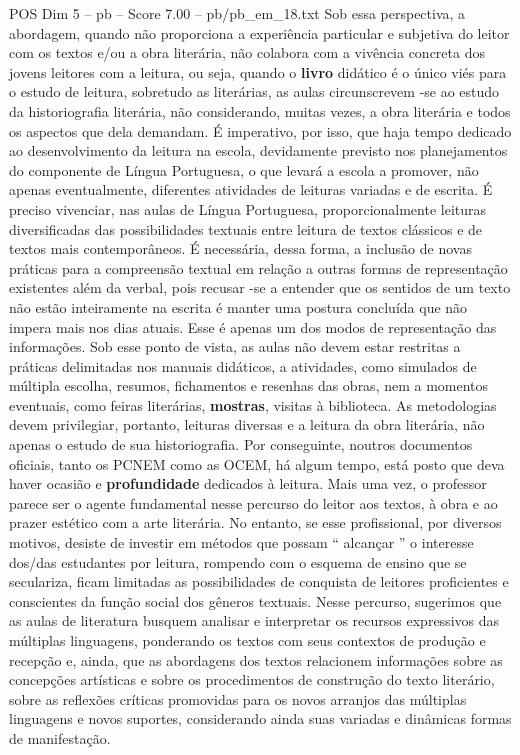 \begin{textsample}{POS Dim 5 – pb – Score 7.00 – pb/pb\_em\_18.txt}
Sob essa perspectiva, a abordagem, quando não proporciona a experiência particular e subjetiva do leitor com os textos e/ou a obra literária, não colabora com a vivência concreta dos jovens leitores com a leitura, ou seja, quando o \textbf{livro} didático é o único viés para o estudo de leitura, sobretudo as literárias, as aulas circunscrevem -se ao estudo da historiografia literária, não considerando, muitas vezes, a obra literária e todos os aspectos que dela demandam.
É imperativo, por isso, que haja tempo dedicado ao desenvolvimento da leitura na escola, devidamente previsto nos planejamentos do componente de Língua Portuguesa, o que levará a escola a promover, não apenas eventualmente, diferentes atividades de leituras variadas e de escrita.
É preciso vivenciar, nas aulas de Língua Portuguesa, proporcionalmente leituras diversificadas das possibilidades textuais entre leitura de textos clássicos e de textos mais contemporâneos.
É necessária, dessa forma, a inclusão de novas práticas para a compreensão textual em relação a outras formas de representação existentes além da verbal, pois recusar -se a entender que os sentidos de um texto não estão inteiramente na escrita é manter uma postura concluída que não impera mais nos dias atuais.
Esse é apenas um dos modos de representação das informações.
Sob esse ponto de vista, as aulas não devem estar restritas a práticas delimitadas nos manuais didáticos, a atividades, como simulados de múltipla escolha, resumos, fichamentos e resenhas das obras, nem a momentos eventuais, como feiras literárias, \textbf{mostras}, visitas à biblioteca.
As metodologias devem privilegiar, portanto, leituras diversas e a leitura da obra literária, não apenas o estudo de sua historiografia.
Por conseguinte, noutros documentos oficiais, tanto os PCNEM como as OCEM, há algum tempo, está posto que deva haver ocasião e \textbf{profundidade} dedicados à leitura.
Mais uma vez, o professor parece ser o agente fundamental nesse percurso do leitor aos textos, à obra e ao prazer estético com a arte literária.
No entanto, se esse profissional, por diversos motivos, desiste de investir em métodos que possam “ alcançar ” o interesse dos/das estudantes por leitura, rompendo com o esquema de ensino que se seculariza, ficam limitadas as possibilidades de conquista de leitores proficientes e conscientes da função social dos gêneros textuais.
Nesse percurso, sugerimos que as aulas de literatura busquem analisar e interpretar os recursos expressivos das múltiplas linguagens, ponderando os textos com seus contextos de produção e recepção e, ainda, que as abordagens dos textos relacionem informações sobre as concepções artísticas e sobre os procedimentos de construção do texto literário, sobre as reflexões críticas promovidas para os novos arranjos das múltiplas linguagens e novos suportes, considerando ainda suas variadas e dinâmicas formas de manifestação.

\end{textsample}
